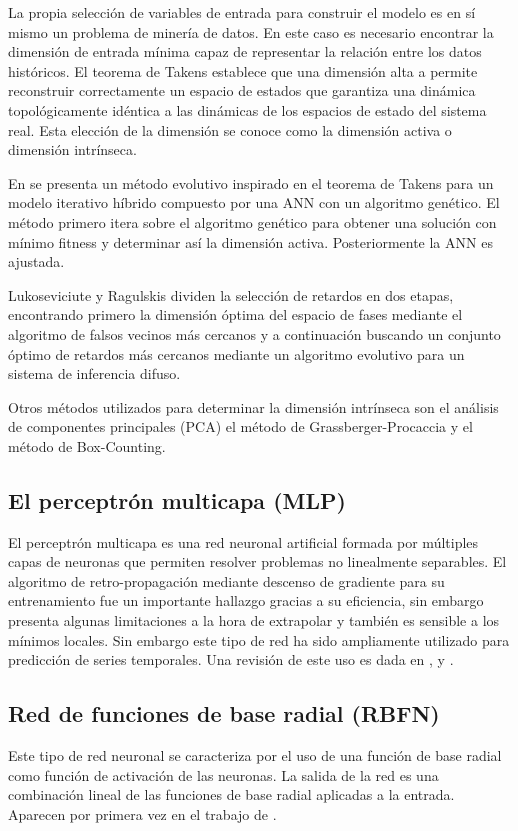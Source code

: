 \documentclass{llncs}
\begin{document}
La propia selección de variables de entrada para construir el modelo es en sí mismo un problema de minería de datos. En este caso es necesario encontrar la dimensión de entrada mínima capaz de representar la relación entre los datos históricos. El teorema de Takens \cite{Takens1981366} establece que una dimensión alta a permite reconstruir correctamente un espacio de estados que garantiza una dinámica topológicamente idéntica a las dinámicas de los espacios de estado del sistema real. Esta elección de la dimensión se conoce como la dimensión activa o dimensión intrínseca.

En \cite{ferreira2008new} se presenta un método evolutivo inspirado en el teorema de Takens para un modelo iterativo híbrido compuesto por una ANN con un algoritmo genético. El método primero itera sobre el algoritmo genético para obtener una solución con mínimo fitness y determinar así la dimensión activa. Posteriormente la ANN es ajustada. 

Lukoseviciute y Ragulskis \cite{lukoseviciute2010evolutionary} dividen la selección de retardos en dos etapas, encontrando primero la dimensión óptima del espacio de fases mediante el algoritmo de falsos vecinos más cercanos y a continuación buscando un conjunto óptimo de retardos más cercanos mediante un algoritmo evolutivo para un sistema de inferencia difuso.

Otros métodos utilizados para determinar la dimensión intrínseca son el análisis de componentes principales (PCA) el método de Grassberger-Procaccia \cite{grassberger2004measuring} y  el método de Box-Counting. 


\subsection{El perceptrón multicapa (MLP)}

El perceptrón multicapa es una red neuronal artificial formada por múltiples capas de neuronas que permiten resolver problemas no linealmente separables. El algoritmo de retro-propagación mediante descenso de gradiente para su entrenamiento fue un importante hallazgo gracias a su eficiencia, sin embargo presenta algunas limitaciones a la hora de extrapolar y también es sensible a los mínimos locales. Sin embargo este tipo de red ha sido ampliamente utilizado para predicción de series temporales. Una revisión de este uso es dada en \cite{hippert2001neural}, \cite{azoff1994neural} y \cite{hoptroff1993principles}.


\subsection{Red de funciones de base radial (RBFN)}
Este tipo de red neuronal se caracteriza por el uso de una función de base radial como función de activación de las neuronas. La salida de la red es una combinación lineal de las funciones de base radial aplicadas a la entrada. Aparecen por primera vez en el trabajo de \cite{broomhead1988radial}. 
\end{document}
